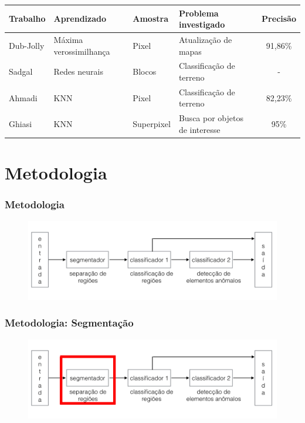 \documentclass[t]{beamer}
\begin{document}
\begin{frame}
	\tiny{
		\begin{table}[h]
		\centering
		\begin{tabulary}{\linewidth}{|L|L|L|L|C|}
		\hline
		\textbf{Trabalho} &  \textbf{Aprendizado} & \textbf{Amostra} & \textbf{Problema investigado} &  \textbf{Precisão} \\ \hline
		Dub-Jolly & Máxima verossimilhança & Pixel      & Atualização de mapas           & 91,86\% \\ \hline
		Sadgal    & Redes neurais         & Blocos     & Classificação de terreno       & -       \\ \hline
		Ahmadi    & KNN                   & Pixel      & Classificação de terreno       & 82,23\% \\ \hline
		Ghiasi    & KNN                   & Superpixel & Busca por objetos de interesse & 95\%    \\ \hline
		\end{tabulary}
		\end{table}
	}
\end{frame}


\section{Metodologia}

\begin{frame}[c]
	\frametitle{Metodologia}
	\begin{figure}[h]
    	\includegraphics[width=\textwidth]{imgs/arquitetura}
	\end{figure}
\end{frame}

\begin{frame}[c]
	\frametitle{Metodologia: Segmentação}
	\begin{figure}[h]
    	\includegraphics[width=\textwidth]{imgs/arquitetura_1}
	\end{figure}
\end{frame}
\end{document}
